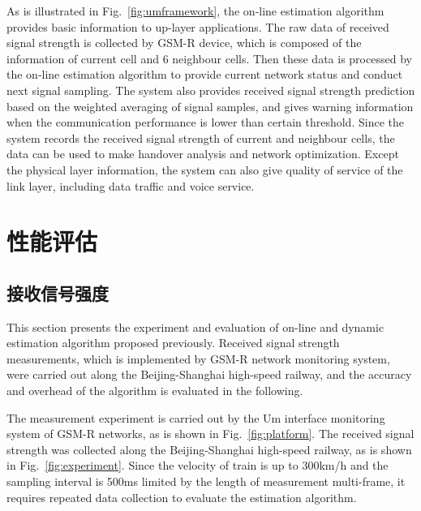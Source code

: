 As is illustrated in Fig.~\ref{fig:umframework}, the on-line estimation algorithm provides basic information to up-layer applications. The raw data of received signal strength is collected by GSM-R device, which is composed of the information of current cell and 6 neighbour cells. Then these data is processed by the on-line estimation algorithm to provide current network status and conduct next signal sampling. The system also provides received signal strength prediction based on the weighted averaging of signal samples, and gives warning information when the communication performance is lower than certain threshold. Since the system records the received signal strength of current and neighbour cells, the data can be used to make handover analysis and network optimization. Except the physical layer information, the system can also give quality of service of the link layer, including data traffic and voice service.


\section{性能评估}
\label{chap:evaluation_phy}

\subsection{接收信号强度}
\label{sec:rss}

This section presents the experiment and evaluation of on-line and dynamic estimation algorithm proposed previously. Received signal strength measurements, which is implemented by GSM-R network monitoring system, were carried out along the Beijing-Shanghai high-speed railway, and the accuracy and overhead of the algorithm is evaluated in the following.

The measurement experiment is carried out by the Um interface monitoring system of GSM-R networks, as is shown in Fig.~\ref{fig:platform}. The received signal strength was collected along the Beijing-Shanghai high-speed railway, as is shown in Fig.~\ref{fig:experiment}. Since the velocity of train is up to 300km/h and the sampling interval is 500ms limited by the length of measurement multi-frame, it requires repeated data collection to evaluate the estimation algorithm.


